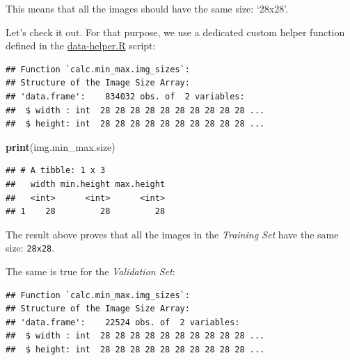 \documentclass[
]{report}
\newenvironment{Shaded}{\begin{snugshade}}{\end{snugshade}}
\newcommand{\FunctionTok}[1]{\textcolor[rgb]{0.13,0.29,0.53}{\textbf{#1}}}
\newcommand{\NormalTok}[1]{#1}
\newcommand{\OtherTok}[1]{\textcolor[rgb]{0.56,0.35,0.01}{#1}}
\newcommand{\SpecialCharTok}[1]{\textcolor[rgb]{0.81,0.36,0.00}{\textbf{#1}}}
\begin{document}
This means that all the images should have the same size: `28x28'.

Let's check it out. For that purpose, we use a dedicated custom helper function defined in the \href{https://github.com/AzKurban-edX-DS/edx.capstone.choose-your-own/tree/main/r/support-functions/data-helper.R\#L344}{data-helper.R} script:

\begin{Shaded}
\end{Shaded}

\begin{verbatim}
## Function `calc.min_max.img_sizes`:
## Structure of the Image Size Array:
## 'data.frame':    834032 obs. of  2 variables:
##  $ width : int  28 28 28 28 28 28 28 28 28 28 ...
##  $ height: int  28 28 28 28 28 28 28 28 28 28 ...
\end{verbatim}

\begin{Shaded}
\begin{Highlighting}[]
\FunctionTok{print}\NormalTok{(img.min\_max.size)}
\end{Highlighting}
\end{Shaded}

\begin{verbatim}
## # A tibble: 1 x 3
##   width min.height max.height
##   <int>      <int>      <int>
## 1    28         28         28
\end{verbatim}

The result above proves that all the images in the \emph{Training Set} have the same size: \texttt{28x28}.

The same is true for the \emph{Validation Set}:

\begin{Shaded}
\end{Shaded}

\begin{verbatim}
## Function `calc.min_max.img_sizes`:
## Structure of the Image Size Array:
## 'data.frame':    22524 obs. of  2 variables:
##  $ width : int  28 28 28 28 28 28 28 28 28 28 ...
##  $ height: int  28 28 28 28 28 28 28 28 28 28 ...
\end{verbatim}
\end{document}
